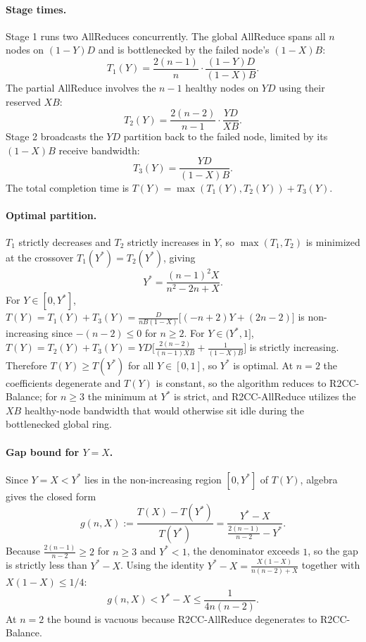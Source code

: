 \documentclass[letterpaper,twocolumn,10pt]{article}
\begin{document}
\paragraph{Stage times.} Stage 1 runs two AllReduces concurrently. The global AllReduce spans all $n$ nodes on $(1-Y)D$ and is bottlenecked by the failed node's $(1-X)B$:
$$T_1(Y) = \frac{2(n-1)}{n} \cdot \frac{(1-Y)D}{(1-X)B}.$$
The partial AllReduce involves the $n-1$ healthy nodes on $YD$ using their reserved $XB$:
$$T_2(Y) = \frac{2(n-2)}{n-1} \cdot \frac{YD}{XB}.$$
Stage 2 broadcasts the $YD$ partition back to the failed node, limited by its $(1-X)B$ receive bandwidth:
$$T_3(Y) = \frac{YD}{(1-X)B}.$$
The total completion time is $T(Y) = \max(T_1(Y), T_2(Y)) + T_3(Y)$.

\paragraph{Optimal partition.} $T_1$ strictly decreases and $T_2$ strictly increases in $Y$, so $\max(T_1, T_2)$ is minimized at the crossover $T_1(Y^*) = T_2(Y^*)$, giving
$$Y^* = \frac{(n-1)^2 X}{n^2 - 2n + X}.$$
For $Y \in [0, Y^*]$, $T(Y) = T_1(Y) + T_3(Y) = \frac{D}{nB(1-X)}\bigl[(-n+2)Y + (2n-2)\bigr]$ is non-increasing since $-(n-2) \leq 0$ for $n \geq 2$. For $Y \in (Y^*, 1]$, $T(Y) = T_2(Y) + T_3(Y) = YD\bigl[\frac{2(n-2)}{(n-1)XB} + \frac{1}{(1-X)B}\bigr]$ is strictly increasing. Therefore $T(Y) \geq T(Y^*)$ for all $Y \in [0, 1]$, so $Y^*$ is optimal. At $n = 2$ the coefficients degenerate and $T(Y)$ is constant, so the algorithm reduces to R2CC-Balance; for $n \geq 3$ the minimum at $Y^*$ is strict, and R2CC-AllReduce utilizes the $XB$ healthy-node bandwidth that would otherwise sit idle during the bottlenecked global ring.

\paragraph{Gap bound for $Y = X$.} Since $Y = X < Y^*$ lies in the non-increasing region $[0, Y^*]$ of $T(Y)$, algebra gives the closed form
$$g(n, X) := \frac{T(X) - T(Y^*)}{T(Y^*)} = \frac{Y^* - X}{\frac{2(n-1)}{n-2} - Y^*}.$$
Because $\frac{2(n-1)}{n-2} \geq 2$ for $n \geq 3$ and $Y^* < 1$, the denominator exceeds $1$, so the gap is strictly less than $Y^* - X$. Using the identity $Y^* - X = \frac{X(1-X)}{n(n-2) + X}$ together with $X(1-X) \leq 1/4$:
$$g(n, X) < Y^* - X \leq \frac{1}{4n(n-2)}.$$
At $n = 2$ the bound is vacuous because R2CC-AllReduce degenerates to R2CC-Balance.
\end{document}
